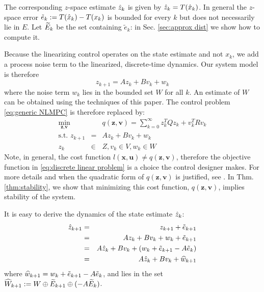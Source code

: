 The corresponding $z$-space estimate $\hat{z}_{k}$ is given by $\hat{z}_{k} = T(\hat{x}_{k})$.
In general the $z$-space error $\tilde{e}_k := T(\hat{x}_k) - T(x_k)$ is bounded for every $k$ but does not necessarily lie in $E$.
Let $\widetilde{E}_{k}$ be the set containing $\tilde{e}_k$: in Sec. \ref{sec:approx dist} we show how to compute it.

Because the linearizing control operates on the state estimate and not $x_k$, we add a process noise term to the linearized, discrete-time dynamics. 
Our system model is therefore
\begin{equation}
\label{eq:discrete linear dyn}
z_{k+1} = Az_k + Bv_k + w_k
\end{equation}
where the noise term $w_k$ lies in the bounded set $W$ for all $k$.
An estimate of $W$ can be obtained using the techniques of this paper.
The control problem \eqref{eq:generic NLMPC} is therefore replaced by:
\begin{eqnarray}
\label{eq:discrete linear problem}
\min_{\textbf{z},\textbf{v}} &\;& q(\mathbf{z},\mathbf{v}) = \sum_{k=0}^{\infty}z_k^TQz_k + v_k^TRv_k \\
\text{s.t. } z_{k+1} &=& Az_k + Bv_k + w_k\nonumber \\
z_k&\in& Z,  v_k \in V,w_k \in W  \nonumber
\end{eqnarray}
Note, in general, the cost function $l(\mathbf{x},\mathbf{u}) \neq q(\mathbf{z},\mathbf{v})$, therefore the  objective function in \eqref{eq:discrete linear problem} is a choice the control designer makes. For more details and when the quadratic form of $q(\mathbf{z},\mathbf{v})$ is justified, see \cite{SimonLG13_MPC}.
In Thm. \ref{thm:stability}, we show that minimizing this cost function, $q(\mathbf{z},\mathbf{v})$, implies stability of the system.

It is easy to derive the dynamics of the state estimate $\hat{z}_{k}$: 
\begin{eqnarray}
\label{eq:dynamics_estimate}
\hat{z}_{k+1} &=& z_{k+1} + \tilde{e}_{k+1} \\
&=&Az_k + Bv_k + w_k + \tilde{e}_{k+1}  \nonumber\\
&=&A\hat{z}_k + Bv_k + (w_k+ \tilde{e}_{k+1} -A \tilde{e}_{k}) \nonumber\\
&=&A\hat{z}_k + Bv_k + \widehat{w}_{k+1} \nonumber
\end{eqnarray}
where $\widehat{w}_{k+1} = w_k+ \tilde{e}_{k+1} -A \tilde{e}_{k}$, and lies in the set $\widehat{W}_{k+1} := W\oplus\widetilde{E}_{k+1}\oplus(-A\widetilde{E}_k)$. 

